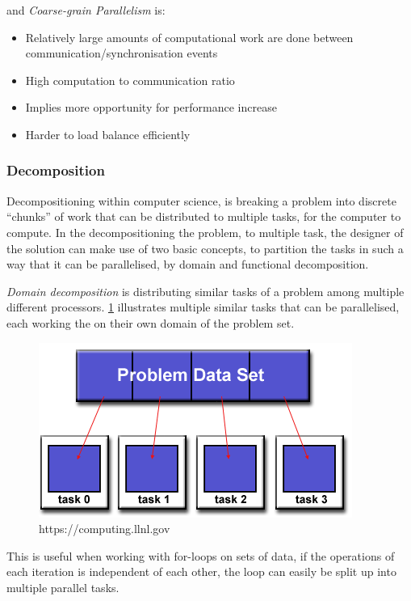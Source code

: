 and \emph{Coarse-grain Parallelism} is:

\begin{itemize}
\item Relatively large amounts of computational work are done between communication/synchronisation events
\item High computation to communication ratio
\item Implies more opportunity for performance increase
\item Harder to load balance efficiently
\end{itemize}

\subsubsection{Decomposition}
Decompositioning within computer science, is breaking a problem into discrete \enquote{chunks} of work that can be distributed to multiple tasks, for the computer to compute. In the decompositioning the problem, to multiple task, the designer of the solution can make use of two basic concepts, to partition the tasks in such a way that it can be parallelised, by domain and functional decomposition.

\emph{Domain decomposition} is distributing similar tasks of a problem among multiple different processors. \cref{dom} illustrates multiple similar tasks that can be parallelised, each working the on their own domain of the problem set.

\begin{figure}[htbp]\label{dom}
\includegraphics[width=\textwidth]{Analysis/Supercomputing/domain_decomp.png}
\caption{https://computing.llnl.gov}
\end{figure}

This is useful when working with for-loops on sets of data, if the operations of each iteration is independent of each other, the loop can easily be split up into multiple parallel tasks.


